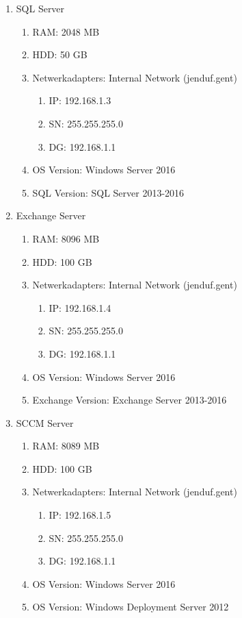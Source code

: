 \documentclass[a4paper]{article}
\begin{document}
\begin{enumerate}
\item SQL Server
    \begin{enumerate}
    \item RAM: 2048 MB
    \item HDD: 50 GB
    \item Netwerkadapters: Internal Network (jenduf.gent)
            \begin{enumerate}
            \item IP: 192.168.1.3
            \item SN: 255.255.255.0
            \item DG: 192.168.1.1
            \end{enumerate}
    \item OS Version: Windows Server 2016
    \item SQL Version: SQL Server 2013-2016
    \end{enumerate}
\item Exchange Server
    \begin{enumerate}
    \item RAM: 8096 MB
    \item HDD: 100 GB
    \item Netwerkadapters: Internal Network (jenduf.gent)
            \begin{enumerate}
            \item IP: 192.168.1.4
            \item SN: 255.255.255.0
            \item DG: 192.168.1.1
            \end{enumerate}
    \item OS Version: Windows Server 2016
    \item Exchange Version: Exchange Server 2013-2016
    \end{enumerate}
\item SCCM Server
    \begin{enumerate}
    \item RAM: 8089 MB
    \item HDD: 100 GB
    \item Netwerkadapters: Internal Network (jenduf.gent)
            \begin{enumerate}
            \item IP: 192.168.1.5
            \item SN: 255.255.255.0
            \item DG: 192.168.1.1
            \end{enumerate}
    \item OS Version: Windows Server 2016
    \item OS Version: Windows Deployment Server 2012
    \end{enumerate}
\end{enumerate}
\end{document}
